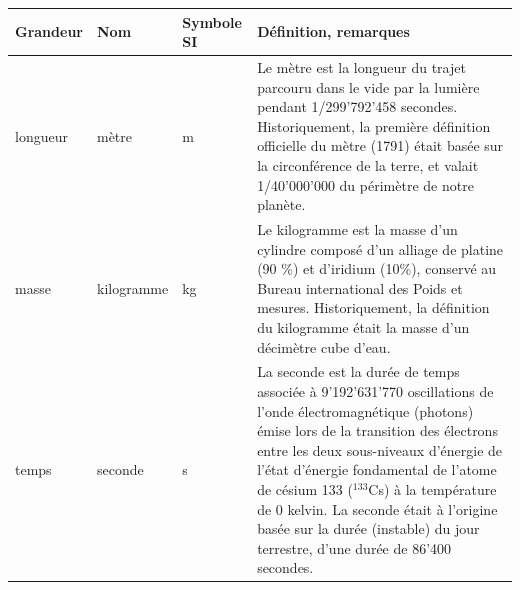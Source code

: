 \begin{center}
\begin{tabular}[t]{>{\pbs\raggedright}p{2.5cm}
                   >{\pbs\centering}p{2.2cm}
                   >{\pbs\centering}p{2.3cm}
                   >{\pbs\raggedright}p{7cm}}
\hline\hline
\textbf{Grandeur} & \textbf{Nom} & \textbf{Symbole SI} & \textbf{Définition, remarques}\\
\hline
longueur & mètre & m &
Le mètre est la longueur du trajet parcouru dans le vide par la lumière pendant 1/299'792'458 secondes. Historiquement, la première définition officielle du mètre (1791) était basée sur la circonférence de la terre, et valait 1/40'000'000 du périmètre de notre planète.
\\ \hline
masse & kilogramme & kg &
Le kilogramme est la masse d'un cylindre composé d'un alliage de platine (90 \%) et d'iridium (10\%), conservé au Bureau international des Poids et mesures. Historiquement, la définition du kilogramme était la masse d'un décimètre cube d'eau.
\\ \hline
temps & seconde & s &
La seconde est la durée de temps associée à 9'192'631'770 oscillations de l'onde électromagnétique (photons) émise lors de la transition des électrons entre les deux sous-niveaux d'énergie de l'état d'énergie fondamental de l'atome de césium 133 ($^{133}$Cs) à la température de 0 kelvin. La seconde était à l'origine basée sur la durée (instable) du jour terrestre, d'une durée de 86'400 secondes.
\\ \hline
\end{tabular}
\end{center}
